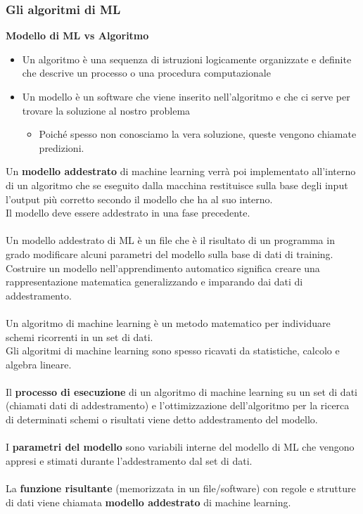 \documentclass[../main.tex]{subfiles}
\begin{document}
	\subsubsection{Gli algoritmi di ML}
	\textbf{Modello di ML vs Algoritmo}
	\begin{itemize}
		\item Un algoritmo è una sequenza di istruzioni logicamente organizzate e definite che descrive un processo o una procedura computazionale
		\item Un modello è un software che viene inserito nell'algoritmo e che ci serve per trovare la soluzione al nostro problema
		\begin{itemize}
			\item Poiché spesso non conosciamo la vera soluzione, queste vengono chiamate predizioni.
		\end{itemize}
	\end{itemize}
	Un \textbf{modello addestrato} di machine learning verrà poi implementato all'interno di un algoritmo che se eseguito dalla macchina restituisce sulla base degli input l'output più corretto secondo il modello che ha al suo interno. \\
	Il modello deve essere addestrato in una fase precedente.\\\\
	Un modello addestrato di ML è un file che è il risultato di un programma in grado modificare alcuni parametri del modello sulla base di dati di training. \\
	Costruire un modello nell'apprendimento automatico significa creare una rappresentazione matematica generalizzando e imparando dai dati di addestramento.\\\\
	Un algoritmo di machine learning è un metodo matematico per individuare schemi ricorrenti in un set di dati. \\
	Gli algoritmi di machine learning sono spesso ricavati da statistiche, calcolo e algebra lineare.\\\\
	Il \textbf{processo di esecuzione} di un algoritmo di machine learning su un set di dati (chiamati dati di addestramento) e l'ottimizzazione dell'algoritmo per la ricerca di determinati schemi o risultati viene detto addestramento del modello.\\\\
	I \textbf{parametri del modello} sono variabili interne del modello di ML che vengono appresi e stimati durante l'addestramento dal set di dati.\\\\
	La \textbf{funzione risultante} (memorizzata in un file/software) con regole e strutture di dati viene chiamata \textbf{modello addestrato} di machine learning.
\end{document}
